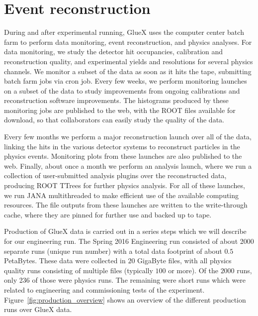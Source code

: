 

\section[Event reconstruction (Alex A.)]{Event reconstruction \label{sec:reconstruction}}


During and after experimental running, GlueX uses the computer center batch farm to perform data monitoring, event reconstruction, and physics analyses.  For data monitoring, we study the detector hit occupancies, calibration and reconstruction quality, and experimental yields and resolutions for several physics channels.  We monitor a subset of the data as soon as it hits the tape, submitting batch farm jobs via cron job.  Every few weeks, we perform monitoring launches 
on a subset of the data to study improvements from ongoing calibrations and reconstruction software improvements.  The histograms produced by these monitoring jobs are published to the web, with the ROOT files available for download, so that collaborators can easily study the quality of the data. 

Every few months we perform a major reconstruction launch over all of the data, linking the hits in the various detector systems to reconstruct particles in the physics events.  Monitoring plots from these launches are also published to the web. Finally, about once a month we perform an analysis launch, where we run a collection of user-submitted analysis plugins over the reconstructed data, 
producing ROOT TTrees for further physics analysis. For all of these launches, we run JANA multithreaded to make efficient use of the available computing 
resources. %
The file outputs from these launches are written to the write-through cache, where they are pinned for further use and backed up to tape.  

Production of GlueX data is carried out in a series steps which we will describe for our engineering run. The Spring 2016 Engineering run consisted of about 2000 separate runs (unique run number) with a total data footprint of about $0.5$ PetaBytes. These data were collected in $20$ GigaByte files, with all physics quality runs consisting of multiple files (typically $100$ or more). Of the $2000$ runs, only 236 of those 
were physics runs. The remaining were short runs which were related to engineering and commissioning tests of the experiment. Figure~\ref{fig:production_overview} shows an overview of the different production runs over GlueX data. 

